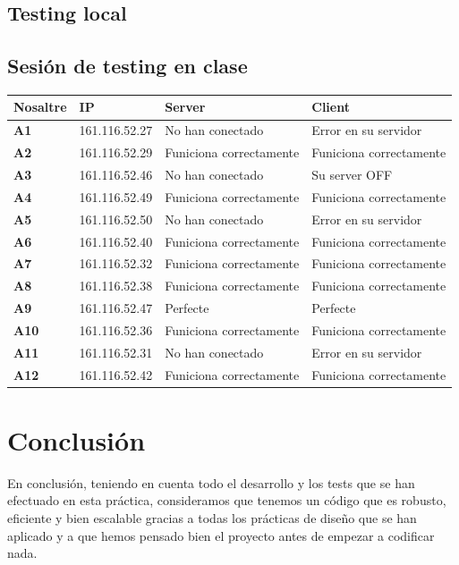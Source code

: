 \subsection*{Testing local}

\newpage
\subsection*{Sesión de testing en clase}
\begin{center}
    \begin{tabular}{| l || l | l | l |}
    \hline
    \textbf{Nosaltre} & \textbf{IP} & \textbf{Server} & \textbf{Client} \\ \hline
    \textbf{A1} & 161.116.52.27 & No han conectado  & Error en su servidor \\ \hline
	\textbf{A2} & 161.116.52.29 &  Funiciona correctamente & Funiciona correctamente\\ \hline
	\textbf{A3}	& 161.116.52.46 & No han conectado   & Su server OFF\\
	\textbf{A4}	& 161.116.52.49 & Funiciona correctamente  & Funiciona correctamente\\ \hline
	\textbf{A5}	& 161.116.52.50 & No han conectado   & Error en su servidor\\ \hline
	\textbf{A6}	& 161.116.52.40 & Funiciona correctamente  & Funiciona correctamente\\ \hline
	\textbf{A7}	& 161.116.52.32 & Funiciona correctamente  & Funiciona correctamente\\ \hline
	\textbf{A8}	& 161.116.52.38 & Funiciona correctamente  & Funiciona correctamente\\ \hline
	\textbf{A9}	& 161.116.52.47 & Perfecte  & Perfecte\\ \hline
	\textbf{A10}	 & 161.116.52.36 &  Funiciona correctamente & Funiciona correctamente\\ \hline
	\textbf{A11}	 & 161.116.52.31 & No han conectado   & Error en su servidor\\ \hline
	\textbf{A12}	 & 161.116.52.42 & Funiciona correctamente  & Funiciona correctamente\\ \hline
    \end{tabular}
\end{center}


\newpage
\section*{Conclusión}
En conclusión, teniendo en cuenta todo el desarrollo y los tests que se han efectuado en esta práctica, consideramos que tenemos un código que es robusto, eficiente y bien escalable gracias a todas los prácticas de diseño que se han aplicado y a que hemos pensado bien el proyecto antes de empezar a codificar nada.


